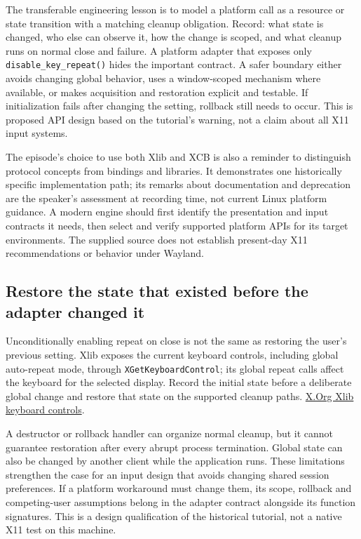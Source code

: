 The transferable engineering lesson is to model a platform call as a resource or state transition with a matching cleanup obligation. Record: what state is changed, who else can observe it, how the change is scoped, and what cleanup runs on normal close and failure. A platform adapter that exposes only \texttt{disable\_key\_repeat()} hides the important contract. A safer boundary either avoids changing global behavior, uses a window-scoped mechanism where available, or makes acquisition and restoration explicit and testable. If initialization fails after changing the setting, rollback still needs to occur. This is proposed API design based on the tutorial's warning, not a claim about all X11 input systems.

The episode's choice to use both Xlib and XCB is also a reminder to distinguish protocol concepts from bindings and libraries. It demonstrates one historically specific implementation path; its remarks about documentation and deprecation are the speaker's assessment at recording time, not current Linux platform guidance. A modern engine should first identify the presentation and input contracts it needs, then select and verify supported platform APIs for its target environments. The supplied source does not establish present-day X11 recommendations or behavior under Wayland.

\subsection{Restore the state that existed before the adapter changed it}\label{05-engine-i-ch024-restore-the-state-that-existed-before-the-adapter-changed-it}

Unconditionally enabling repeat on close is not the same as restoring the user's previous setting. Xlib exposes the current keyboard controls, including global auto-repeat mode, through \texttt{XGetKeyboardControl}; its global repeat calls affect the keyboard for the selected display. Record the initial state before a deliberate global change and restore that state on the supported cleanup paths. \href{https://www.x.org/releases/X11R7.6/doc/libX11/specs/libX11/libX11.html}{X.Org Xlib keyboard controls}.

A destructor or rollback handler can organize normal cleanup, but it cannot guarantee restoration after every abrupt process termination. Global state can also be changed by another client while the application runs. These limitations strengthen the case for an input design that avoids changing shared session preferences. If a platform workaround must change them, its scope, rollback and competing-user assumptions belong in the adapter contract alongside its function signatures. This is a design qualification of the historical tutorial, not a native X11 test on this machine.

